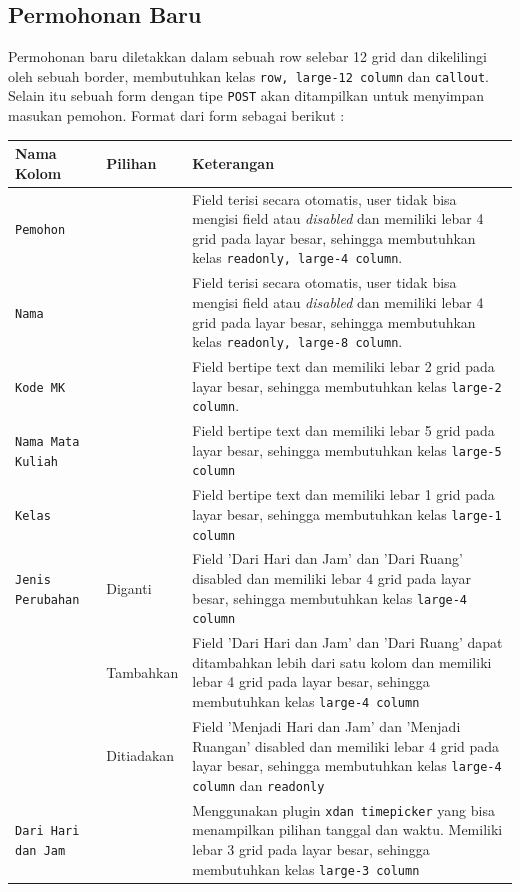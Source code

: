 \documentclass[a4paper,twoside]{article}
\begin{document}
\begin{enumerate}
		
		\subsection{Permohonan Baru}
		Permohonan baru diletakkan dalam sebuah row selebar 12 grid dan dikelilingi oleh sebuah border, membutuhkan kelas \texttt{row, large-12 column} dan \texttt{callout}. Selain itu sebuah form dengan tipe \texttt{POST} akan ditampilkan untuk menyimpan masukan pemohon. Format dari form sebagai berikut :
		
		\begin{tabular}{ |p{4cm}|p{2cm}|p{10cm}|}
			\hline
			Nama Kolom & Pilihan & Keterangan\\
			\hline
			\texttt{Pemohon} &  &Field terisi secara otomatis, user tidak bisa mengisi field atau \textit{disabled} dan memiliki lebar 4 grid pada layar besar, sehingga membutuhkan kelas \verb|readonly, large-4 column|.\\
			\hline
			\texttt{Nama} &  & Field terisi secara otomatis, user tidak bisa mengisi field atau \textit{disabled} dan memiliki lebar 4 grid pada layar besar, sehingga membutuhkan kelas \verb|readonly, large-8 column|.\\
			\hline
			\texttt{Kode MK} & & Field bertipe text dan memiliki lebar 2 grid pada layar besar, sehingga membutuhkan kelas \verb|large-2 column|.\\
			\hline
			\texttt{Nama Mata Kuliah} & & Field bertipe text dan memiliki lebar 5 grid pada layar besar, sehingga membutuhkan kelas \verb|large-5 column| \\
			\hline
			\texttt{Kelas} &  & Field bertipe text dan memiliki lebar 1 grid pada layar besar, sehingga membutuhkan kelas \verb|large-1 column| \\
			\hline
			\texttt{Jenis Perubahan} & Diganti &  Field 'Dari Hari dan Jam' dan 'Dari Ruang' disabled dan memiliki lebar 4 grid pada layar besar, sehingga membutuhkan kelas \verb|large-4 column|  \\
			& Tambahkan &    Field 'Dari Hari dan Jam' dan 'Dari Ruang' dapat ditambahkan lebih dari satu kolom dan memiliki lebar 4 grid pada layar besar, sehingga membutuhkan kelas \verb|large-4 column|\\	 
			& Ditiadakan &  Field 'Menjadi Hari dan Jam' dan 'Menjadi Ruangan' disabled dan memiliki lebar 4 grid pada layar besar, sehingga membutuhkan kelas \verb|large-4 column| dan \verb|readonly|  \\
			\hline
			\texttt{Dari Hari dan Jam} &  & Menggunakan plugin \texttt{xdan timepicker}   yang bisa menampilkan pilihan tanggal dan waktu. Memiliki lebar 3 grid pada layar besar, sehingga membutuhkan kelas \verb|large-3 column| \\

\end{tabular}
\end{enumerate}
\end{document}
